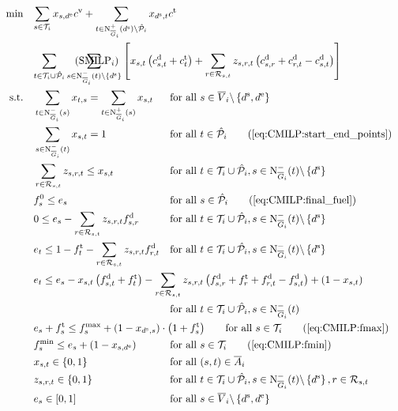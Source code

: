 \begin{align}
	\min \quad & \omit\rlap{$\displaystyle{\sum_{s\in\Ti} x_{s,\de}\cv + \sum_{t\in\Noutoi(\ds)\backslash\Phat_i} x_{\ds, t}\ct}$} \nonumber \\
	& \omit\rlap{$\displaystyle{\sum_{t\in\Ti\cup\Phat_i}\sum_{s\in\Ninoi(t)\backslash\left\{\ds\right\}}\left[x_{s,t}\left(\cd_{s,t}+\ct_t\right)+\sum_{r\in\Rst}z_{s,r,t}\left(\cd_{s,r}+\cd_{r,t}-\cd_{s,t}\right)\right]}$} \tag{$\operatorname{SMILP}_i$} \label{eq:SMILPi} \\
	\text{s.t.} \quad & \sum_{t\in\Ninoi(s)} x_{t,s} = \sum_{t\in\Noutoi(s)} x_{s,t} & & \text{for all } s\in \overline{V}_i\backslash\left\{\ds,\de\right\} \label{eq:CMILP:flow} \\
	& \sum_{s\in\Ninoi(t)} x_{s,t} = 1 && \text{for all } t\in\Phat_i \tag{\ref{eq:CMILP:start_end_points}} \\	
	& \sum_{r\in\Rst} z_{s,r,t} \leq x_{s,t} && \text{for all } t\in\Ti\cup\Phat_i, s\in\Ninoi(t)\backslash\left\{\ds\right\} \label{eq:CMILP:refuel} \\
	& f^0_s \leq e_s && \text{for all } s\in\Phat_i \tag{\ref{eq:CMILP:final_fuel}} \\
	& 0 \leq e_s - \sum_{r\in\Rst} z_{s,r,t}\fd_{s,r} & & \text{for all } t\in\Ti\cup\Phat_i, s\in\Ninoi(t)\backslash\left\{\ds\right\} \label{eq:CMILP:min_fuel} \\
	& e_t \leq 1 - \ft_t - \sum_{r\in\Rst} z_{s,r,t}\fd_{r,t} & & \text{for all } t\in\Ti\cup\Phat_i, s\in\Ninoi(t)\backslash\left\{\ds\right\} \label{eq:CMILP:max_fuel} \\
	& \omit\rlap{$\displaystyle{e_t \leq e_s - x_{s,t}\left(f_{s,t}^{\operatorname{d}}+f_t^{\operatorname{t}}\right) - \sum_{r\in\Rst} z_{s,r,t}\left(\fd_{s,r}+\ft_r+\fd_{r,t}-\fd_{s,t}\right) + \left(1-x_{s,t}\right)}$} \nonumber \\
	& & & \text{for all } t\in\Ti\cup\Phat_i, s\in\Ninoi(t) \label{eq:CMILP:fuel_consumption} \\
	& \omit\rlap{$\displaystyle{e_s + \ft_s \leq f^{\max}_s + \left(1-x_{\ds,s}\right)\cdot\left(1+\ft_s\right)} \qquad \text{for all } s\in\Ti \tag{\ref{eq:CMILP:fmax}}$} \\
	& f^{\min}_s \leq e_s + \left(1-x_{s,\de}\right) && \text{for all } s\in\Ti \tag{\ref{eq:CMILP:fmin}} \\
	& x_{s,t}\in\{0,1\} & & \text{for all } (s,t)\in\overline{A}_i \label{eq:CMILP:xst} \\
	& z_{s,r,t}\in\{0,1\} & & \text{for all } t\in\Ti\cup\Phat_i,s\in\Ninoi(t)\backslash\left\{\ds\right\},r\in\Rst \label{eq:CMILP:zsrt} \\
	& e_s\in[0,1] & & \text{for all } s\in\overline{V}_i\backslash\left\{\ds,\de\right\} \label{eq:CMILP:es}
\end{align}

